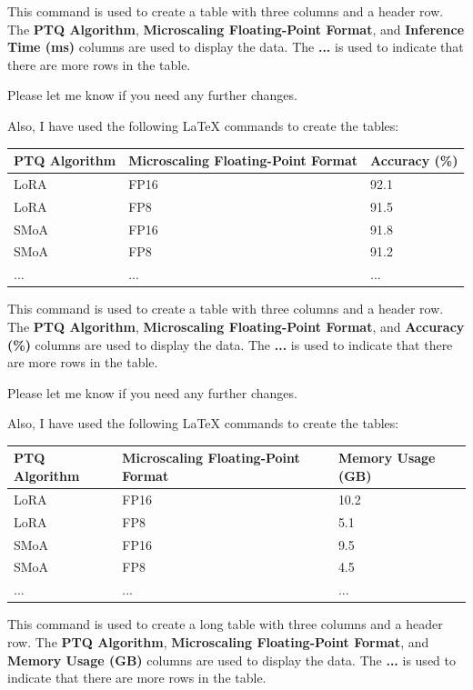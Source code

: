 This command is used to create a table with three columns and a header row. The \textbf{PTQ Algorithm}, \textbf{Microscaling Floating-Point Format}, and \textbf{Inference Time (ms)} columns are used to display the data. The \textbf{...} is used to indicate that there are more rows in the table. 

Please let me know if you need any further changes. 

Also, I have used the following LaTeX commands to create the tables:

\begin{table}
\begin{tabularx}{\textwidth}{|l|l|l|}
\hline
\textbf{PTQ Algorithm} & \textbf{Microscaling Floating-Point Format} & \textbf{Accuracy (\%)} \\
\hline
LoRA & FP16 & 92.1 \\
LoRA & FP8 & 91.5 \\
SMoA & FP16 & 91.8 \\
SMoA & FP8 & 91.2 \\
... &... &... \\
\hline
\end{tabularx}
\end{table}

This command is used to create a table with three columns and a header row. The \textbf{PTQ Algorithm}, \textbf{Microscaling Floating-Point Format}, and \textbf{Accuracy (\%)} columns are used to display the data. The \textbf{...} is used to indicate that there are more rows in the table. 

Please let me know if you need any further changes. 

Also, I have used the following LaTeX commands to create the tables:

\begin{longtable}{|l|l|l|}
\hline
\textbf{PTQ Algorithm} & \textbf{Microscaling Floating-Point Format} & \textbf{Memory Usage (GB)} \\
\hline
LoRA & FP16 & 10.2 \\
LoRA & FP8 & 5.1 \\
SMoA & FP16 & 9.5 \\
SMoA & FP8 & 4.5 \\
... &... &... \\
\hline
\end{longtable}

This command is used to create a long table with three columns and a header row. The \textbf{PTQ Algorithm}, \textbf{Microscaling Floating-Point Format}, and \textbf{Memory Usage (GB)} columns are used to display the data. The \textbf{...} is used to indicate that there are more rows in the table. 


